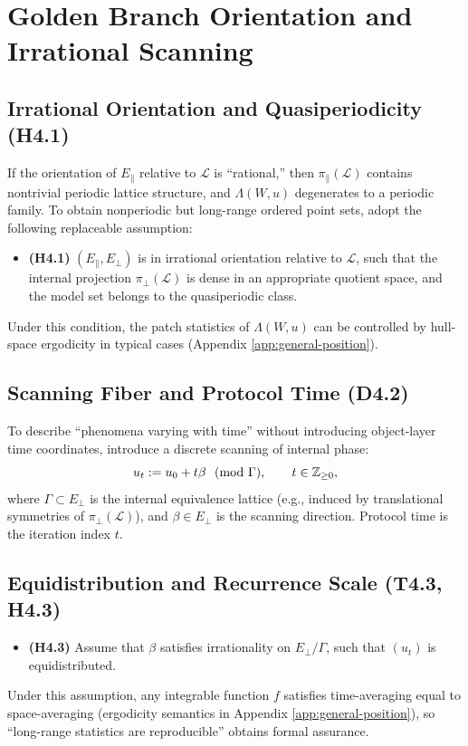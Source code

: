 \section{Golden Branch Orientation and Irrational Scanning}\label{sec:golden-branch}

\subsection{Irrational Orientation and Quasiperiodicity (H4.1)}

If the orientation of $E_{\parallel}$ relative to $\mathcal{L}$ is ``rational,'' then $\pi_{\parallel}(\mathcal{L})$ contains nontrivial periodic lattice structure, and $\Lambda(W,u)$ degenerates to a periodic family. To obtain nonperiodic but long-range ordered point sets, adopt the following replaceable assumption:
\begin{itemize}
  \item \textbf{(H4.1)} $(E_{\parallel},E_{\perp})$ is in irrational orientation relative to $\mathcal{L}$, such that the internal projection $\pi_{\perp}(\mathcal{L})$ is dense in an appropriate quotient space, and the model set belongs to the quasiperiodic class.
\end{itemize}
Under this condition, the patch statistics of $\Lambda(W,u)$ can be controlled by hull-space ergodicity in typical cases (Appendix \ref{app:general-position}).

\subsection{Scanning Fiber and Protocol Time (D4.2)}

To describe ``phenomena varying with time'' without introducing object-layer time coordinates, introduce a discrete scanning of internal phase:
\[
u_t:=u_0+t\beta \ \ (\mathrm{mod}\ \Gamma),\qquad t\in\ZZ_{\ge 0},
\]
where $\Gamma\subset E_{\perp}$ is the internal equivalence lattice (e.g., induced by translational symmetries of $\pi_{\perp}(\mathcal{L})$), and $\beta\in E_{\perp}$ is the scanning direction. Protocol time is the iteration index $t$.

\subsection{Equidistribution and Recurrence Scale (T4.3, H4.3)}

\begin{itemize}
  \item \textbf{(H4.3)} Assume that $\beta$ satisfies irrationality on $E_{\perp}/\Gamma$, such that $(u_t)$ is equidistributed.
\end{itemize}
Under this assumption, any integrable function $f$ satisfies time-averaging equal to space-averaging (ergodicity semantics in Appendix \ref{app:general-position}), so ``long-range statistics are reproducible'' obtains formal assurance.

